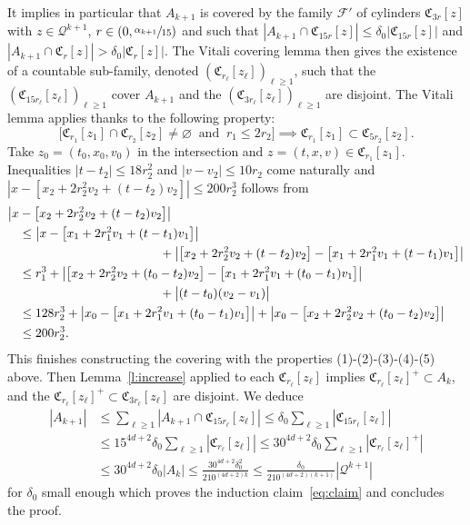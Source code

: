\documentclass[10pt]{amsart}
\let\mathcal\mathscr
\theoremstyle{definition}
\theoremstyle{remark}
\newcommand{\cQ}{\mathcal Q}
\begin{document}
It implies in particular that $A_{k+1}$ is covered by the family
$\mathcal F'$ of cylinders $\mathfrak C_{3r}[z]$ with $z \in \cQ^{k+1}$,
$r \in (0,\sfrac{\alpha_{k+1}}{15})$ and such that
$|A_{k+1} \cap \mathfrak C_{15r}[z]| \le \delta_0 |\mathfrak C_{15
r}[z]|$ and
$|A_{k+1} \cap \mathfrak C_{r}[z]| > \delta_0 |\mathfrak
C_{r}[z]|$. The Vitali covering lemma then gives the existence of
a countable sub-family, denoted
$(\mathfrak C_{r_\ell}[z_\ell])_{\ell \ge 1}$, such that the
$(\mathfrak C_{15 r_\ell}[z_\ell])_{\ell \ge 1}$ cover $A_{k+1}$
and the $(\mathfrak C_{3 r_\ell}[z_\ell])_{\ell \ge 1}$ are
disjoint. The Vitali lemma applies thanks to the following
property:
\begin{equation*}
\Big[ \mathfrak C_{r_1}[z_1] \cap \mathfrak C_{r_2}[z_2] \neq
\varnothing \ \mbox{ and } \ r_1\le 2r_2 \Big] \implies \mathfrak C_{r_1}[z_1] \subset
\mathfrak C_{5r_2}[z_2].
\end{equation*}
Take $z_0=(t_0,x_0,v_0)$ in the intersection and
$z=(t,x,v)\in \mathfrak C_{r_1}[z_1]$. Inequalities
$|t-t_2|\leq 18 r_2^2$ and $|v-v_2|\leq 10r_2$ come naturally and
$|x-[x_2+2 r_2^2v_2 +(t-t_2)v_2]| \le 200r_2^3$ follows from
\begin{align*}
\big| x&- \big[ x_2+ 2r_2^2v_2 + (t-t_2)v_2 \big] \big| \\
&\le \big| x- \big[ x_1+ 2r_1^2v_1 + (t-t_1)v_1 \big] \big|\\
&\hspace*{4cm} +
\big| \big[ x_2+ 2r_2^2v_2 + (t-t_2)v_2 \big] - \big[ x_1+
2r_1^2v_1 + (t-t_1)v_1 \big] \big| \\
& \le r_1^3 + \big| \big[ x_2+ 2r_2^2v_2 + (t_0-t_2)v_2 \big] -
\big[ x_1+ 2r_1^2v_1 + (t_0-t_1)v_1 \big] \big|\\
&\hspace*{4cm} + \big|
(t-t_0)(v_2-v_1) \big| \\
& \le 128 r_2^3 + \big| x_0- \big[ x_1+ 2r_1^2v_1 +
(t_0-t_1)v_1 \big] \big| + \big| x_0- \big[ x_2+ 2r_2^2v_2 +
(t_0-t_2)v_2 \big] \big|\\
&\le 200 r_2^3.
\end{align*}
This finishes constructing the covering with the properties
(1)-(2)-(3)-(4)-(5) above. Then Lemma~\ref{l:increase} applied to
each $\mathfrak C_{r_\ell}[z_\ell]$ implies
$\mathfrak C_{r_\ell}[z_\ell]^+ \subset A_k$, and the
$\mathfrak C_{r_\ell}[z_\ell]^+ \subset \mathfrak C_{3
r_\ell}[z_\ell]$ are disjoint. We deduce
\begin{align*}
|A_{k+1}|
& \le \sum_{\ell \ge 1} |A_{k+1} \cap \mathfrak C_{15
r_\ell}[z_\ell]| \le \delta_0 \sum_{\ell \ge 1}
|\mathfrak C_{15 r_\ell}[z_\ell]| \\
& \le 15^{4d+2} \delta_0 \sum_{\ell \ge 1} |\mathfrak
C_{r_\ell}[z_\ell]| \le 30^{4d+2} \delta_0 \sum_{\ell \ge 1}
|\mathfrak C_{r_\ell}[z_\ell]^+| \\
& \le 30^{4d+2} \delta_0 |A_k|
\le \frac{30^{4d+2}\delta_0^2}{210^{(4d+2)k}}
\le \frac{\delta_0}{210^{(4d+2)(k+1)}} \left| \cQ^{k+1}
\right|
\end{align*}
for $\delta_0$ small enough which proves the induction
claim~\eqref{eq:claim} and concludes the proof.
\end{document}
